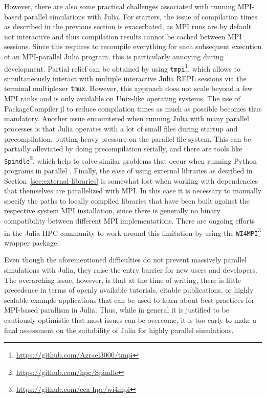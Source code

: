 \documentclass[hidelinks]{juliacon} %
\begin{document}
However, there are also some practical challenges associated with running MPI-based parallel
simulations with Julia. For starters, the issue of compilation times as described in the previous
section is exacerbated, as MPI runs are by default not interactive and thus compilation results cannot be cached between MPI sessions. Since this
requires to recompile everything for each subsequent execution of an MPI-parallel Julia program,
this is particularly annoying during development. Partial relief can be obtained by using
\texttt{tmpi}\footnote{\url{https://github.com/Azrael3000/tmpi}}, which allows to simultaneously
interact with multiple interactive Julia REPL sessions via the terminal multiplexer \texttt{tmux}.
However, this approach does not scale beyond a few MPI ranks and is only available on
Unix-like operating systems. The use of PackageCompiler.jl to reduce compilation times as much as
possible becomes thus mandatory. Another issue encountered when running Julia with many parallel
processes is that Julia operates with a lot of small files during startup and precompilation,
putting heavy pressure on the parallel file system. This can be partially alleviated by doing
precompilation serially, and there are tools like
\texttt{Spindle}\footnote{\url{https://github.com/hpc/Spindle}}, which help to solve similar
problems that occur when running Python programs in parallel \cite{frings2013parallelloading}.
Finally, the ease of using external libraries as desribed in Section~\ref{sec:external-libraries} is
somewhat lost when working with dependencies that themselves are parallelized with MPI. In this
case it is necessary to manually specify the paths to locally compiled libraries that have been
built against the respective system MPI installation, since there is generally no binary
compatibility between different MPI implementations. There are ongoing efforts in the Julia HPC
community to work around this limitation by using the
\texttt{WI4MPI}\footnote{\url{https://github.com/cea-hpc/wi4mpi}} wrapper package.

Even though the aforementioned difficulties do not prevent massively parallel simulations with
Julia, they raise the entry barrier for new users and developers. The overarching issue, however, is
that at the time of writing, there is little precedence in terms of openly available tutorials,
citable publications, or highly scalable example applications that can be used to learn about best
practices for MPI-based parallism in Julia. Thus, while in general it is justified to be cautiously
optimistic that most issues can be overcome, it is too early to make a final assessment on the
suitability of Julia for highly parallel simulations.
\end{document}
